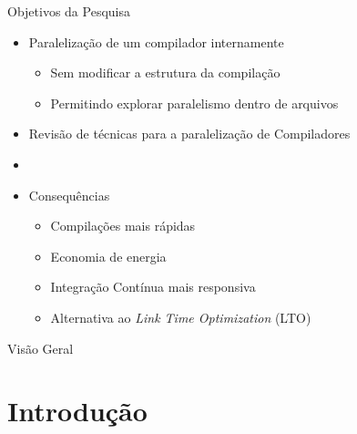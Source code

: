 \customtitlepage


\begin{frame}{Objetivos da Pesquisa}
    \begin{itemize}
        \item Paralelização de um compilador internamente
        \begin{itemize}
            \item Sem modificar a estrutura da compilação
            \item Permitindo explorar paralelismo dentro de arquivos
        \end{itemize}
        \item Revisão de técnicas para a paralelização de Compiladores
        \item[]
        \item Consequências
        \begin{itemize}
            \item Compilações mais rápidas
            \item Economia de energia
            \item Integração Contínua mais responsiva
            \item Alternativa ao \textit{Link Time Optimization} (LTO)
        \end{itemize}
    \end{itemize}
\end{frame}

\begin{frame}{Visão Geral}
  \overview
\end{frame}

\section{Introdução}

